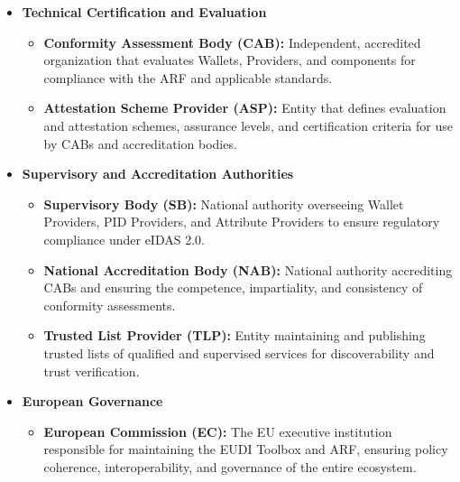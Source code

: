 \documentclass[sigconf,balance,nonacm,authordraft]{acmart}
\begin{document}
\begin{itemize}
  \item \textbf{Technical Certification and Evaluation}
    \begin{itemize}
      \item \textbf{Conformity Assessment Body (CAB):}
      Independent, accredited organization that evaluates Wallets, Providers, and components for compliance with the ARF and applicable standards.
      \item \textbf{Attestation Scheme Provider (ASP):}
      Entity that defines evaluation and attestation schemes, assurance levels, and certification criteria for use by CABs and accreditation bodies.
    \end{itemize}

  \item \textbf{Supervisory and Accreditation Authorities}
    \begin{itemize}
      \item \textbf{Supervisory Body (SB):}
      National authority overseeing Wallet Providers, PID Providers, and Attribute Providers to ensure regulatory compliance under eIDAS 2.0.
      \item \textbf{National Accreditation Body (NAB):}
      National authority accrediting CABs and ensuring the competence, impartiality, and consistency of conformity assessments.
      \item \textbf{Trusted List Provider (TLP):}
      Entity maintaining and publishing trusted lists of qualified and supervised services for discoverability and trust verification.
    \end{itemize}

  \item \textbf{European Governance}
    \begin{itemize}
      \item \textbf{European Commission (EC):}
      The EU executive institution responsible for maintaining the EUDI Toolbox and ARF, ensuring policy coherence, interoperability, and governance of the entire ecosystem.
    \end{itemize}

\end{itemize}
\end{document}
